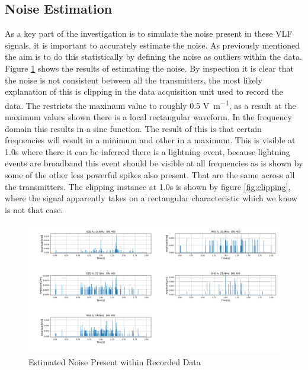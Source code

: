 \subsection{Noise Estimation}\label{sec:noiseEst}
As a key part of the investigation is to simulate the noise present in these VLF signals, it is important to accurately estimate the noise. As previously mentioned the aim is to do this statistically by defining the noise as outliers within the data. Figure \ref{fig:noise estimate} shows the results of estimating the noise. By inspection it is clear that the noise is not consistent between all the transmitters, the most likely explanation of this is clipping in the data acquisition unit used to record the data. The restricts the maximum value to roughly 0.5 \si{\volt \per\metre}, as a result at the maximum values shown there is a local rectangular waveform. In the frequency domain this results in a sinc function. The result of this is that certain frequencies will result in a minimum and other in a maximum. This is visible at 1.0\si{\second} where there it can be inferred there is a lightning event, because lightning events are broadband this event should be visible at all frequencies as is shown by some of the other less powerful spikes also present. That are the same across all the transmitters. The clipping instance at 1.0\si{\second} is shown by figure \ref{fig:clipping}, where the signal apparently takes on a rectangular characteristic which we know is not that case.

\begin{figure}[h!]
    \centering
    \includegraphics[width = \textwidth]{figs/sig_character/noiseEstimate.png}
    \caption{Estimated Noise Present within Recorded Data}
    \label{fig:noise estimate}
\end{figure}

